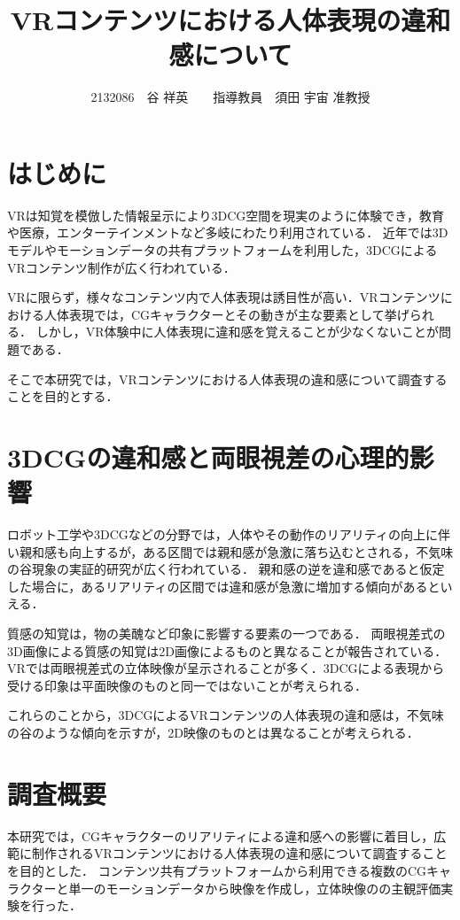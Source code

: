 \documentclass[twocolumn,10pt,a4j]{ltjsarticle}
\title{VRコンテンツにおける人体表現の違和感について}
\author{2132086　谷 祥英　　指導教員　須田 宇宙 准教授}
\date{}
\begin{document}
\maketitle

\section{はじめに}
  VRは知覚を模倣した情報呈示により3DCG空間を現実のように体験でき，教育や医療，エンターテインメントなど多岐にわたり利用されている．
  近年では3Dモデルやモーションデータの共有プラットフォームを利用した，3DCGによるVRコンテンツ制作が広く行われている．

  VRに限らず，様々なコンテンツ内で人体表現は誘目性が高い．VRコンテンツにおける人体表現では，CGキャラクターとその動きが主な要素として挙げられる．
  しかし，VR体験中に人体表現に違和感を覚えることが少なくないことが問題である．

  そこで本研究では，VRコンテンツにおける人体表現の違和感について調査することを目的とする．

\section{3DCGの違和感と両眼視差の心理的影響}
  ロボット工学や3DCGなどの分野では，人体やその動作のリアリティの向上に伴い親和感も向上するが，ある区間では親和感が急激に落ち込むとされる，不気味の谷現象の実証的研究が広く行われている\cite{Uncanny}．
  親和感の逆を違和感であると仮定した場合に，あるリアリティの区間では違和感が急激に増加する傾向があるといえる．

  質感の知覚は，物の美醜など印象に影響する要素の一つである．
  両眼視差式の3D画像による質感の知覚は2D画像によるものと異なることが報告されている\cite{VR_texture}．
  VRでは両眼視差式の立体映像が呈示されることが多く．3DCGによる表現から受ける印象は平面映像のものと同一ではないことが考えられる．

  これらのことから，3DCGによるVRコンテンツの人体表現の違和感は，不気味の谷のような傾向を示すが，2D映像のものとは異なることが考えられる．

\section{調査概要}
  本研究では，CGキャラクターのリアリティによる違和感への影響に着目し，広範に制作されるVRコンテンツにおける人体表現の違和感について調査することを目的とした．
  コンテンツ共有プラットフォームから利用できる複数のCGキャラクターと単一のモーションデータから映像を作成し，立体映像のの主観評価実験を行った．
\end{document}
